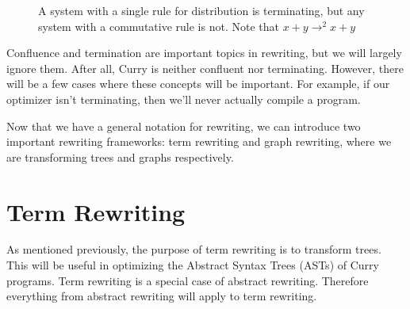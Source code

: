 \documentclass{book}
\theoremstyle{definition}
\begin{document}
\begin{figure}[h]
  \begin{subfigure}{.5\textwidth}
    \centering
  \end{subfigure}
  \begin{subfigure}{.5\textwidth}
    \centering
  \end{subfigure}
    \caption{A system with a single rule for distribution is terminating,
             but any system with a commutative rule is not.
             Note that $x + y \to^2 x + y$}
    \label{fig:terminate}
\end{figure}

Confluence and termination are important topics in rewriting, but we will largely ignore them.
After all, Curry is neither confluent nor terminating.
However, there will be a few cases where these concepts will be important.
For example, if our optimizer isn't terminating, then we'll never actually compile a program.

Now that we have a general notation for rewriting, we can introduce two important rewriting frameworks:
term rewriting and graph rewriting, where we are transforming trees and graphs respectively.


\section{Term Rewriting}

As mentioned previously, the purpose of term rewriting is to transform trees.
This will be useful in optimizing the Abstract Syntax Trees (ASTs) of Curry programs.
Term rewriting is a special case of abstract rewriting.
Therefore everything from abstract rewriting will apply to term rewriting.
\end{document}
